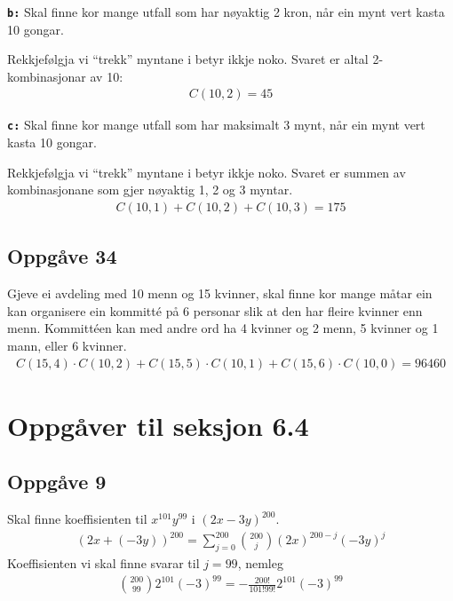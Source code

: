 \documentclass[a4paper, 11pt]{article}
\newcommand{\deloppg}[1]{\vspace{1mm}\noindent \textbf{\tt \themecolor{#1:}}}
\newcommand{\themeshade}{Mahogany}
\newcommand{\themecolor}[1]{\textcolor{\themeshade}{#1}}
\begin{document}
\deloppg{b}
Skal finne kor mange utfall som har nøyaktig 2 kron, når ein mynt vert kasta 10 gongar.

Rekkjefølgja vi ``trekk'' myntane i betyr ikkje noko. Svaret er altal 2-kombinasjonar av 10:
\begin{align*}
    C(10,2) = 45
\end{align*}

\deloppg{c}
Skal finne kor mange utfall som har maksimalt 3 mynt, når ein mynt vert kasta 10 gongar.

Rekkjefølgja vi ``trekk'' myntane i betyr ikkje noko. Svaret er summen av kombinasjonane
som gjer nøyaktig 1, 2 og 3 myntar.
\begin{align*}
    C(10,1) + C(10,2) + C(10,3) = 175
\end{align*}


\subsection*{Oppgåve 34}
Gjeve ei avdeling med 10 menn og 15 kvinner, skal finne kor mange måtar ein kan organisere ein
kommitté på 6 personar slik at den har fleire kvinner enn menn. Kommittéen kan med andre ord ha
4 kvinner og 2 menn, 5 kvinner og 1 mann, eller 6 kvinner.
\begin{align*}
    C(15,4) \cdot C(10,2) + C(15,5) \cdot C(10,1) + C(15,6) \cdot C(10, 0) = 96460
\end{align*}


\section*{Oppgåver til seksjon 6.4}
\subsection*{Oppgåve 9}
Skal finne koeffisienten til \(x^{101}y^{99}\) i \((2x - 3y)^{200}\).
\begin{align*}
    (2x + (-3y))^{200} = \sum_{j = 0}^{200}{200 \choose j} (2x)^{200-j}(-3y)^j
\end{align*}
Koeffisienten vi skal finne svarar til \(j = 99\), nemleg
\begin{align*}
    {200 \choose 99}2^{101}(-3)^{99} = -\frac{200!}{101!99!}2^{101}(-3)^{99}
\end{align*}
\end{document}
